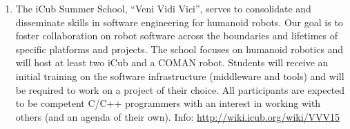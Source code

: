 \begin{enumerate}

\item The iCub Summer School, ``Veni Vidi Vici'', serves to consolidate and disseminate skills in software engineering for humanoid robots. Our goal is to foster collaboration on robot software across the boundaries and lifetimes of specific platforms and projects.
The school focuses on humanoid robotics and will host at least two iCub and a COMAN robot. Students will receive an initial training on the software infrastructure (middleware and tools) and will be required to work on a project of their choice. All participants are expected to be competent C/C++ programmers with an interest in working with others (and an agenda of their own). Info: \url{http://wiki.icub.org/wiki/VVV15}


\end{enumerate}
